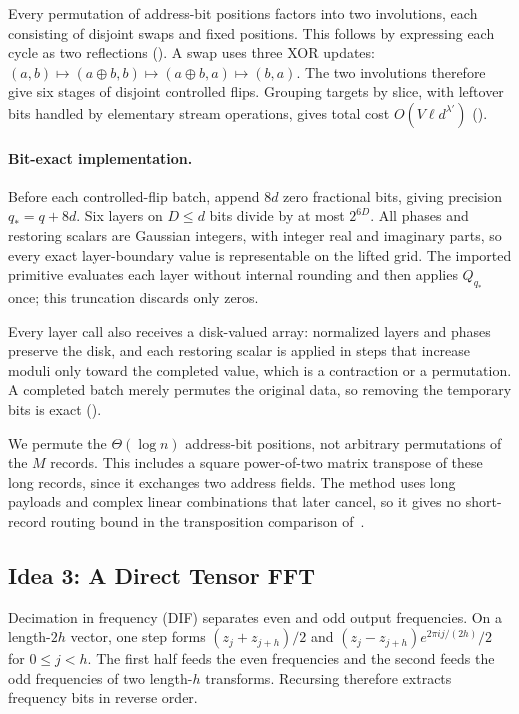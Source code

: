 \documentclass[11pt]{article}
\theoremstyle{definition}
\begin{document}
Every permutation of address-bit positions factors into two involutions, each consisting of disjoint swaps and fixed positions.
This follows by expressing each cycle as two reflections ().
A swap uses three XOR updates:
$(a,b)\mapsto(a\oplus b,b)\mapsto(a\oplus b,a)\mapsto(b,a)$.
The two involutions therefore give six stages of disjoint controlled flips.
Grouping targets by slice, with leftover bits handled by elementary stream operations, gives total cost $O(V\ell d^{\lambda'})$ ().

\paragraph{Bit-exact implementation.}
Before each controlled-flip batch, append $8d$ zero fractional bits, giving precision $q_*=q+8d$.
Six layers on $D\le d$ bits divide by at most $2^{6D}$.
All phases and restoring scalars are Gaussian integers, with integer real and imaginary parts, so every exact layer-boundary value is representable on the lifted grid.
The imported primitive evaluates each layer without internal rounding and then applies $Q_{q_*}$ once; this truncation discards only zeros.

Every layer call also receives a disk-valued array: normalized layers and phases preserve the disk, and each restoring scalar is applied in steps that increase moduli only toward the completed value, which is a contraction or a permutation.
A completed batch merely permutes the original data, so removing the temporary bits is exact ().

We permute the $\Theta(\log n)$ address-bit positions, not arbitrary permutations of the $M$ records.
This includes a square power-of-two matrix transpose of these long records, since it exchanges two address fields.
The method uses long payloads and complex linear combinations that later cancel, so it gives no short-record routing bound in the transposition comparison of~\cite{HvdH25}.

\subsection{Idea 3: A Direct Tensor FFT}

Decimation in frequency (DIF) separates even and odd output frequencies.
On a length-$2h$ vector, one step forms $(z_j+z_{j+h})/2$ and $(z_j-z_{j+h})e^{2\pi ij/(2h)}/2$ for $0\le j<h$.
The first half feeds the even frequencies and the second feeds the odd frequencies of two length-$h$ transforms.
Recursing therefore extracts frequency bits in reverse order.
\end{document}
